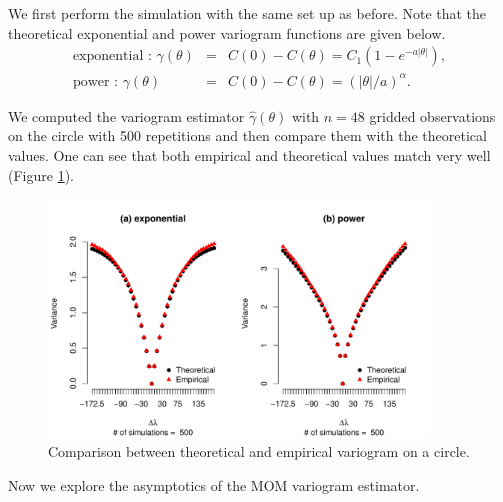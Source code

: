 We first perform the simulation with the same set up as before. Note that the theoretical exponential and power variogram functions are given below.
\begin{eqnarray*}
	\mbox{exponential : }\gamma(\theta) &=& C(0) - C(\theta) = C_1(1-e^{-a|\theta|}), \\
	\mbox{power : } \gamma(\theta) &=& C(0) - C(\theta) = (|\theta|/a)^{\alpha}.
\end{eqnarray*}

We computed the variogram estimator $\hat{\gamma}(\theta)$ with $n = 48$ gridded observations on the circle with 500 repetitions and then compare them with the theoretical values. One can see that both empirical and theoretical values match very well (Figure \ref{variogram_circle}).


\begin{figure}[H]
	\centering
	\includegraphics[width=0.9\textwidth]{graphs/variogram_plot_500}
	\caption[Comparison Between Theoretical and Empirical Variogram on a Circle.]{Comparison between theoretical and empirical variogram on a circle.}
	\label{variogram_circle}
\end{figure}




Now we explore the asymptotics of the MOM variogram estimator.

